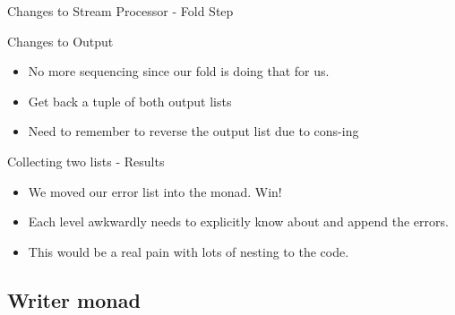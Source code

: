 \documentclass[professionalFonts,aspectratio=169]{beamer}
\begin{document}
\begin{frame}{Changes to Stream Processor - Fold Step}



\end{frame}

\begin{frame}{Changes to Output}



\begin{itemize}
\item No more sequencing since our fold is doing that for us.
\pause \item Get back a tuple of both output lists
\pause \item Need to remember to reverse the output list due to cons-ing
\end{itemize}

\end{frame}

\begin{frame}{Collecting two lists - Results}

\begin{itemize}
\item We moved our error list into the monad. Win!
\pause \item Each level awkwardly needs to explicitly know about and append the errors.
\pause \item This would be a real pain with lots of nesting to the code.
\end{itemize}

\end{frame}

\subsection{Writer monad}
\end{document}
